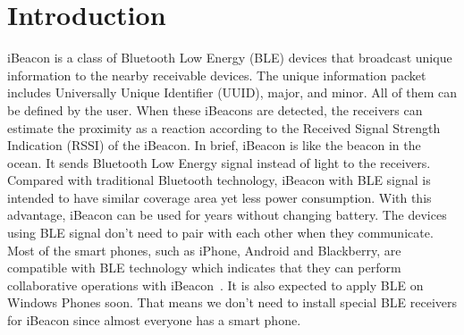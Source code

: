 \documentclass[12pt]{report}
\begin{document}
\tableofcontents


\listoffigures

\listoftables



\clearpage



\setcounter{page}{1}

% 
%
\chapter{Introduction}
iBeacon is a class of Bluetooth Low Energy (BLE) devices that broadcast unique information to the nearby receivable devices. The unique information packet includes Universally Unique Identifier (UUID), major, and minor. All of them can be defined by the user. When these iBeacons are detected, the receivers can estimate the proximity as a reaction according to the Received Signal Strength Indication (RSSI) of the iBeacon. In brief, iBeacon is like the beacon in the ocean. It sends Bluetooth Low Energy signal instead of light to the receivers. Compared with traditional Bluetooth technology, iBeacon with BLE signal is intended to have similar coverage area yet less power consumption. With this advantage, iBeacon can be used for years without changing battery. The devices using BLE signal don't need to pair with each other when they communicate. Most of the smart phones, such as iPhone, Android and Blackberry, are compatible with BLE technology which indicates that they can perform collaborative operations with iBeacon~\cite{ens}. It is also expected to apply BLE on Windows Phones soon. That means we don't need to install special BLE receivers for iBeacon since almost everyone has a smart phone.
\end{document}
